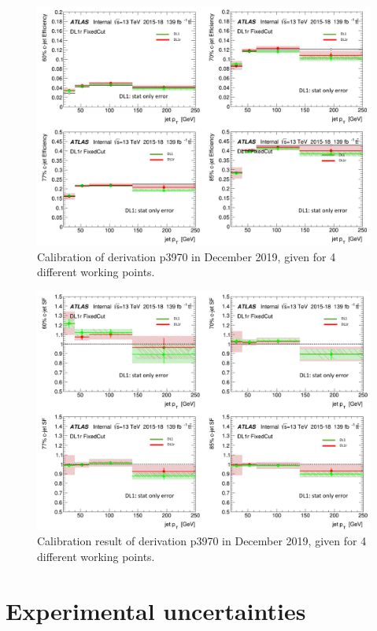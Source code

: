 \documentclass[letterpaper,12pt]{article}
\begin{document}
\newpage
\begin{figure}[H]
\includegraphics[width=1\textwidth]{Dec_eff.png}
\caption{Calibration of derivation p3970 in December 2019, given for  4 different working points.}\label{fig:Dec_eff}
\end{figure}
\newpage
\begin{figure}[H]
\includegraphics[width=1\textwidth]{Dec.png}
\caption{Calibration result of derivation p3970 in December 2019, given for  4 different working points.}\label{fig:Dec}
\end{figure}




\newpage
	

\section{Experimental uncertainties}
\end{document}
